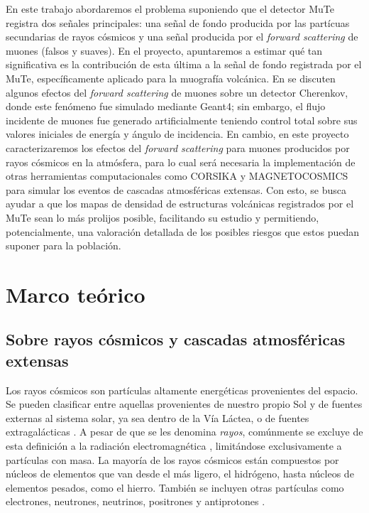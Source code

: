 \documentclass[12pt]{report}
\begin{document}
En este trabajo abordaremos el problema suponiendo que el detector MuTe registra dos señales principales: una señal de fondo producida por las partícuas secundarias de rayos cósmicos y una señal producida por el \textit{forward scattering} de muones (falsos y suaves). En el proyecto, apuntaremos a estimar qué tan significativa es la contribución de esta última a la señal de fondo registrada por el MuTe, específicamente aplicado para la muografía volcánica. En \cite{gomez2017forward} se discuten algunos efectos del \textit{forward scattering} de muones sobre un detector Cherenkov, donde este fenómeno fue simulado mediante Geant4; sin embargo, el flujo incidente de muones fue generado artificialmente teniendo control total sobre sus valores iniciales de energía y ángulo de incidencia. En cambio, en este proyecto caracterizaremos los efectos del \textit{forward scattering} para muones producidos por rayos cósmicos en la atmósfera, para lo cual será necesaria la implementación de otras herramientas computacionales como CORSIKA y MAGNETOCOSMICS para simular los eventos de cascadas atmosféricas extensas. Con esto, se busca ayudar a que los mapas de densidad de estructuras volcánicas registrados por el MuTe sean lo más prolijos posible, facilitando su estudio y permitiendo, potencialmente, una valoración detallada de los posibles riesgos que estos puedan suponer para la población.





\section*{Marco teórico}

\subsection*{Sobre rayos cósmicos y cascadas atmosféricas extensas}

\normalsize

Los rayos cósmicos son partículas  altamente energéticas provenientes del espacio. Se pueden clasificar entre aquellas provenientes de nuestro propio Sol y de fuentes externas al sistema solar, ya sea dentro de la Vía Láctea, o de fuentes extragalácticas \cite{moldwin2008introduction}. A pesar de que se les denomina \textit{rayos}, comúnmente se excluye de esta definición a la radiación electromagnética \cite{NASACosmicopia}, limitándose exclusivamente a partículas con masa. La mayoría de los rayos cósmicos están compuestos por núcleos de elementos que van desde el más ligero, el hidrógeno, hasta núcleos de elementos pesados, como el hierro. También se incluyen otras partículas como electrones, neutrones, neutrinos, positrones y antiprotones \cite{NASAImagine}.
\end{document}
